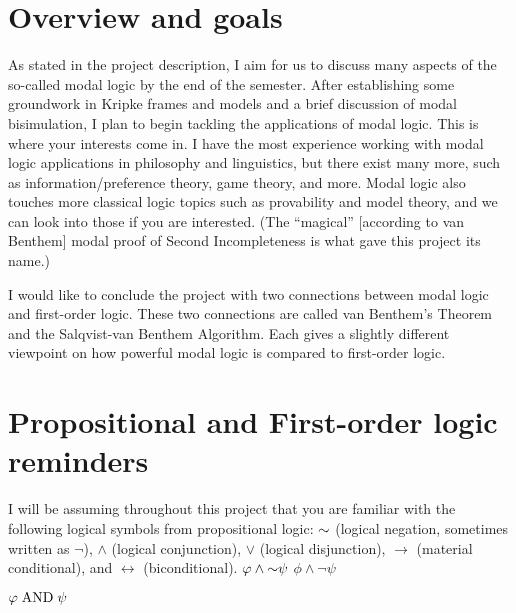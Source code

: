 \section{Overview and goals}
As stated in the project description, I aim for us to discuss many aspects of the so-called modal logic by the end of the semester. 
After establishing some groundwork in Kripke frames and models and a brief discussion of modal bisimulation, I plan to begin tackling 
the applications of modal logic. This is where your interests come in. I have the most experience working with modal logic 
applications in philosophy and linguistics, but there exist many more, such as information/preference theory, game theory, and more. 
Modal logic also touches more classical logic topics such as provability and model theory, and we can look into those if you are interested. 
(The ``magical'' [according to van Benthem] modal proof of Second Incompleteness is what gave this project its name.)

I would like to conclude the project with two connections between modal logic and first-order logic. 
These two connections are called van Benthem's Theorem and the Salqvist-van Benthem Algorithm. 
Each gives a slightly different viewpoint on how powerful modal logic is compared to first-order logic.

\section{Propositional and First-order logic reminders}

I will be assuming throughout this project that you are familiar with the following logical symbols from propositional logic: $\mathord{\sim}$ (logical negation,
sometimes written as $\neg$), $\wedge$ (logical conjunction), $\vee$ (logical disjunction), $\rightarrow$ (material conditional), and $\leftrightarrow$ 
(biconditional). $\varphi \wedge \mathord{\sim} \psi$  $\phi \wedge \neg \psi$

$\varphi \mathord{\;\mathrm{AND}\;} \psi$
